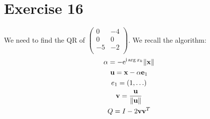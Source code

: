 \section{Exercise 16}
We need to find the QR of $\left( \begin{array}{cc}
0 & -4\\
0 & 0 \\
-5 & -2 \\
\end{array} \right)$.
We recall the algorithm:
\begin{gather*}
 \alpha = - \mathrm{e}^{\mathrm{i} \arg x_k} \|\mathbf{x}\| \\
 \mathbf{u} = \mathbf{x} - \alpha\mathbf{e}_1 \\
 e_1 = \left(1 , \ldots \right)\\
 \mathbf{v} = {\mathbf{u}\over\|\mathbf{u}\|}\\
 Q = I - 2 \mathbf{v}\mathbf{v}^T
\end{gather*}
